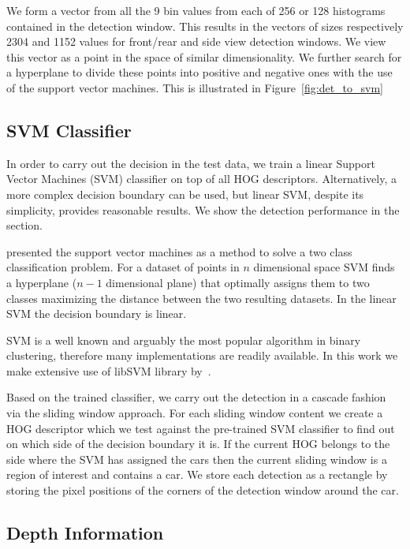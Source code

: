 We form a vector from all the 9 bin values from each of 256 or 128 histograms
contained in the detection window. This results in the vectors of sizes
respectively 2304 and 1152 values for front/rear and side view detection
windows. We view this vector as a point in the space of similar
dimensionality. We further search for a hyperplane to divide these points into
positive and negative ones with the use of the support vector machines. This
is illustrated in Figure~\ref{fig:det_to_svm}


\subsection{SVM Classifier}\label{sub:svm_classifier}

In order to carry out the decision in the test data, we train a linear Support
Vector Machines (SVM) classifier on top of all HOG descriptors. Alternatively,
a more complex decision boundary can be used, but linear SVM, despite its
simplicity, provides reasonable results. We show the detection performance in
the  section.

\citet{svm} presented the support vector machines as a method to solve a two
class classification problem. For a dataset of points in $n$ dimensional space
SVM finds a hyperplane ($n-1$ dimensional plane) that optimally assigns them
to two classes maximizing the distance between the two resulting datasets. In
the linear SVM the decision boundary is linear.

SVM is a well known and arguably the most popular algorithm in binary
clustering, therefore many implementations are readily available. In this work
we make extensive use of libSVM library by~\citet{libSVM2011}.

Based on the trained classifier, we carry out the detection in a cascade
fashion via the sliding window approach. For each sliding window content we
create a HOG descriptor which we test against the pre-trained SVM classifier
to find out on which side of the decision boundary it is. If the current HOG
belongs to the side where the SVM has assigned the cars then the current
sliding window is a region of interest and contains a car. We store each
detection as a rectangle by storing the pixel positions of the corners of the
detection window around the car.


\subsection{Depth Information}\label{sub:depth_information}

